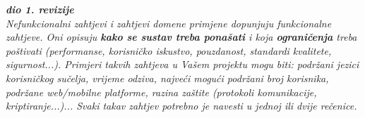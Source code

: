 			\textbf{\textit{dio 1. revizije}}\\
		 
			 \textit{Nefunkcionalni zahtjevi i zahtjevi domene primjene dopunjuju funkcionalne zahtjeve. Oni opisuju \textbf{kako se sustav treba ponašati} i koja \textbf{ograničenja} treba poštivati (performanse, korisničko iskustvo, pouzdanost, standardi kvalitete, sigurnost...). Primjeri takvih zahtjeva u Vašem projektu mogu biti: podržani jezici korisničkog sučelja, vrijeme odziva, najveći mogući podržani broj korisnika, podržane web/mobilne platforme, razina zaštite (protokoli komunikacije, kriptiranje...)... Svaki takav zahtjev potrebno je navesti u jednoj ili dvije rečenice.}
			 
			 
			 
	